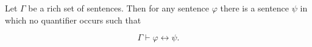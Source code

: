 Let $\Gamma$ be a rich set of sentences. Then for any sentence $\varphi$ there is a sentence $\psi$ in which no quantifier occurs such that

$$\Gamma \vdash \varphi \leftrightarrow \psi.$$
